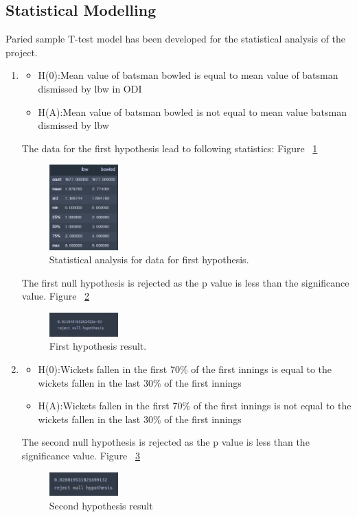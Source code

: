 \documentclass[fleqn,10pt]{wlscirep}
\begin{document}
\subsection{Statistical Modelling}
Paried sample T-test model has been developed for the statistical analysis of the project. 
\begin{enumerate}
\item
\begin{itemize}
\item H(0):Mean value of batsman bowled is equal to mean value of batsman dismissed by lbw in ODI
\item H(A):Mean value of batsman bowled is not equal to mean value batsman dismissed by lbw
\end{itemize}

The data for the first hypothesis lead to following statistics: Figure ~\ref{fig:eleven}
\begin{figure}[!htb]
    \centering
    \includegraphics[width=0.25\textwidth]{lbwbowled.png}
    \caption{Statistical analysis for data for first hypothesis.}
    \label{fig:eleven}
  \end{figure}

  The first null hypothesis is rejected as the p value is less than the significance value. Figure ~\ref{fig:twelve}
  \begin{figure}[!htb]
      \centering
      \includegraphics[width=0.25\textwidth]{lbwbowledhypo.png}
      \caption{First hypothesis result.}
      \label{fig:twelve}
    \end{figure}


\item
\begin{itemize}
    \item H(0):Wickets fallen in the first 70\% of the first innings is equal to the wickets fallen in the last 30\% of the first innings
    \item H(A):Wickets fallen in the first 70\% of the first innings is not equal to the wickets fallen in the last 30\% of the first innings
\end{itemize}
The second null hypothesis is rejected as the p value is less than the significance value. Figure ~\ref{fig:thirteen}
\begin{figure}[!htb]
    \centering
    \includegraphics[width=0.25\textwidth]{secondone.png}
    \caption{Second hypothesis result}
    \label{fig:thirteen}
  \end{figure}


\end{enumerate}
\end{document}
